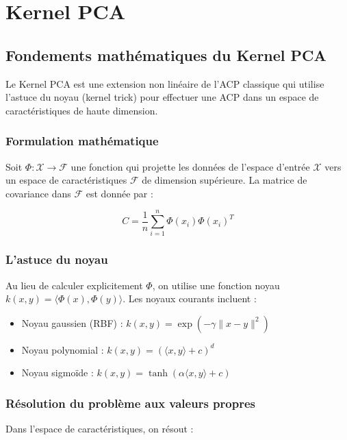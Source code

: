 \documentclass[a4paper,12pt]{report}
\begin{document}
\newpage
\appendix
\chapter{Kernel PCA}
\label{annexe:kernel_pca}

\section{Fondements mathématiques du Kernel PCA}

Le Kernel PCA est une extension non linéaire de l'ACP classique qui utilise l'astuce du noyau (kernel trick) pour effectuer une ACP dans un espace de caractéristiques de haute dimension.

\subsection{Formulation mathématique}

Soit $\Phi : \mathcal{X} \rightarrow \mathcal{F}$ une fonction qui projette les données de l'espace d'entrée $\mathcal{X}$ vers un espace de caractéristiques $\mathcal{F}$ de dimension supérieure. La matrice de covariance dans $\mathcal{F}$ est donnée par :

\[
C = \frac{1}{n}\sum_{i=1}^n \Phi(x_i)\Phi(x_i)^T
\]

\subsection{L'astuce du noyau}

Au lieu de calculer explicitement $\Phi$, on utilise une fonction noyau $k(x,y) = \langle \Phi(x), \Phi(y) \rangle$. Les noyaux courants incluent :

\begin{itemize}
  \item Noyau gaussien (RBF) : $k(x,y) = \exp(-\gamma\|x-y\|^2)$
  \item Noyau polynomial : $k(x,y) = (\langle x,y \rangle + c)^d$
  \item Noyau sigmoïde : $k(x,y) = \tanh(\alpha\langle x,y \rangle + c)$
\end{itemize}

\subsection{Résolution du problème aux valeurs propres}

Dans l'espace de caractéristiques, on résout :
\end{document}
